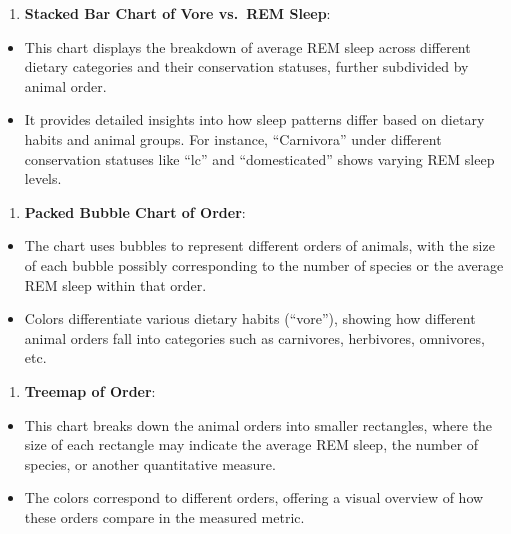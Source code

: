 \documentclass[
  letterpaper,
  DIV=11,
  numbers=noendperiod]{scrreprt}
\providecommand{\tightlist}{%
  \setlength{\itemsep}{0pt}\setlength{\parskip}{0pt}}\usepackage{longtable,booktabs,array}
\begin{document}
\begin{enumerate}
\def\labelenumi{\arabic{enumi}.}
\setcounter{enumi}{1}
\tightlist
\item
  \textbf{Stacked Bar Chart of Vore vs.~REM Sleep}:
\end{enumerate}

\begin{itemize}
\item
  This chart displays the breakdown of average REM sleep across
  different dietary categories and their conservation statuses, further
  subdivided by animal order.
\item
  It provides detailed insights into how sleep patterns differ based on
  dietary habits and animal groups. For instance, ``Carnivora'' under
  different conservation statuses like ``lc'' and ``domesticated'' shows
  varying REM sleep levels.
\end{itemize}

\begin{enumerate}
\def\labelenumi{\arabic{enumi}.}
\setcounter{enumi}{2}
\tightlist
\item
  \textbf{Packed Bubble Chart of Order}:
\end{enumerate}

\begin{itemize}
\item
  The chart uses bubbles to represent different orders of animals, with
  the size of each bubble possibly corresponding to the number of
  species or the average REM sleep within that order.
\item
  Colors differentiate various dietary habits (``vore''), showing how
  different animal orders fall into categories such as carnivores,
  herbivores, omnivores, etc.
\end{itemize}

\begin{enumerate}
\def\labelenumi{\arabic{enumi}.}
\setcounter{enumi}{3}
\tightlist
\item
  \textbf{Treemap of Order}:
\end{enumerate}

\begin{itemize}
\item
  This chart breaks down the animal orders into smaller rectangles,
  where the size of each rectangle may indicate the average REM sleep,
  the number of species, or another quantitative measure.
\item
  The colors correspond to different orders, offering a visual overview
  of how these orders compare in the measured metric.
\end{itemize}
\end{document}
